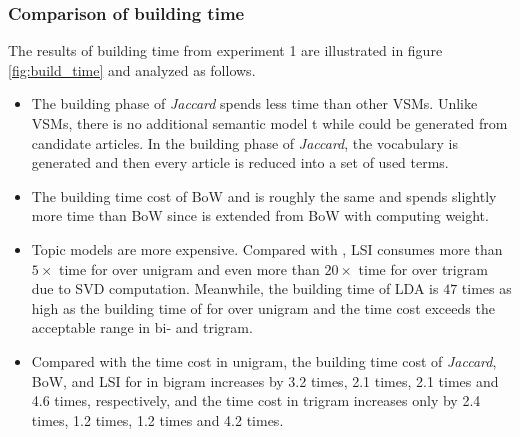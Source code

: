 \subsubsection{Comparison of building time}


The results of building time from experiment 1 are illustrated in figure \ref{fig:build_time} and analyzed as follows. 

\begin{itemize}
\item The building phase of \textit{Jaccard} spends less time than other VSMs. Unlike VSMs, there is no additional semantic model t while could be generated from candidate articles. In the building phase of \textit{Jaccard}, the vocabulary is generated and then every article is reduced into a set of used terms. 

\item The building time cost of BoW and \tfidf{} is roughly the same and \tfidf{} spends slightly more time than BoW since \tfidf{} is extended from BoW with computing \tfidf{} weight. 

\item Topic models are more expensive. Compared with \tfidf{}, LSI consumes more than $5 \times$ time for \icontent{} over unigram and even more than $20 \times$ time for \icontent{} over trigram due to SVD computation. Meanwhile, the building time of LDA is $47$ times as high as the building time of \tfidf{} for \icontent{} over unigram and the time cost exceeds the acceptable range in bi- and trigram. 

\item Compared with the time cost in unigram, the building time cost of \textit{Jaccard}, BoW, \tfidf{} and LSI for \icontent{} in bigram increases by 3.2 times, 2.1 times, 2.1 times and 4.6 times, respectively, and the time cost in trigram increases only by 2.4 times, 1.2 times, 1.2 times and 4.2 times. 

\end{itemize}

